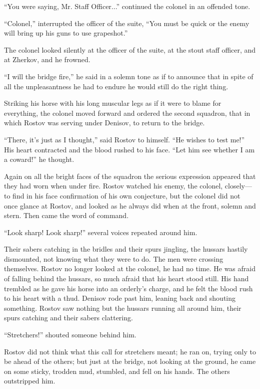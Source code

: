 ``You were saying, Mr. Staff Officer...'' continued the colonel
in an offended tone.

``Colonel,'' interrupted the officer of the suite, ``You must be
quick or the enemy will bring up his guns to use grapeshot.''

The colonel looked silently at the officer of the suite, at the
stout staff officer, and at Zherkov, and he frowned.

``I will the bridge fire,'' he said in a solemn tone as if to
announce that in spite of all the unpleasantness he had to endure
he would still do the right thing.

Striking his horse with his long muscular legs as if it were to
blame for everything, the colonel moved forward and ordered the
second squadron, that in which Rostov was serving under Denisov,
to return to the bridge.

``There, it's just as I thought,'' said Rostov to himself. ``He
wishes to test me!'' His heart contracted and the blood rushed to
his face. ``Let him see whether I am a coward!'' he thought.

Again on all the bright faces of the squadron the serious
expression appeared that they had worn when under fire. Rostov
watched his enemy, the colonel, closely---to find in his face
confirmation of his own conjecture, but the colonel did not once
glance at Rostov, and looked as he always did when at the front,
solemn and stern. Then came the word of command.

``Look sharp! Look sharp!'' several voices repeated around him.

Their sabers catching in the bridles and their spurs jingling,
the hussars hastily dismounted, not knowing what they were to
do. The men were crossing themselves. Rostov no longer looked at
the colonel, he had no time. He was afraid of falling behind the
hussars, so much afraid that his heart stood still. His hand
trembled as he gave his horse into an orderly's charge, and he
felt the blood rush to his heart with a thud. Denisov rode past
him, leaning back and shouting something. Rostov saw nothing but
the hussars running all around him, their spurs catching and
their sabers clattering.

``Stretchers!'' shouted someone behind him.

Rostov did not think what this call for stretchers meant; he ran
on, trying only to be ahead of the others; but just at the
bridge, not looking at the ground, he came on some sticky,
trodden mud, stumbled, and fell on his hands. The others
outstripped him.

